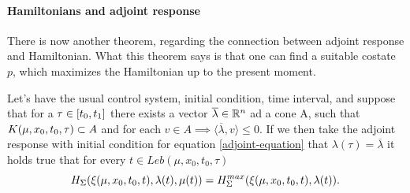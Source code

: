 \paragraph[5.13]{Hamiltonians and adjoint response}
There is now another theorem, regarding the connection between adjoint response and Hamiltonian. What this theorem says is that one can find a suitable costate $p$, which maximizes the Hamiltonian up to the present moment.
 \begin{teo}
 	Let's have the usual control system, initial condition, time interval, and suppose that for a $\tau\in[t_0,t_1]$ there exists a vector $\overline{\lambda}\in\mathbb{R}^n$ ad a cone A, such that $K(\mu,x_0,t_0,\tau)\subset A$ and  for each $v\in A \implies \langle \overline{\lambda},v\rangle\leq0$. If we then take the adjoint response with initial condition for equation \eqref{adjoint-equation} that $\lambda(\tau)=\overline{\lambda}$ it holds true that for every $t\in Leb(\mu,x_0,t_0,\tau)$
\[ H_\Sigma(\xi(\mu,x_0,t_0,t),\lambda(t),\mu(t))=H_\Sigma^{max}(\xi(\mu,x_0,t_0,t),\lambda(t)). \]
\label{5-13}
\label{T9}
 \end{teo}

